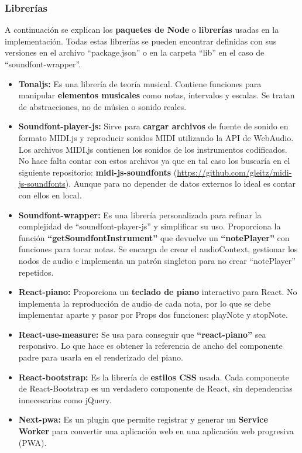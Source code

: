 \documentclass[12pt,twoside,titlepage]{report}
\begin{document}
\subsubsection{Librerías}
A continuación se explican los \textbf{paquetes de Node} o \textbf{librerías} usadas en la implementación. Todas estas librerías se pueden encontrar definidas con sus versiones en el archivo ``package.json'' o en la carpeta ``lib'' en el caso de ``soundfont-wrapper''.

\begin{itemize}
    \item \textbf{Tonaljs:} Es una librería de teoría musical. Contiene funciones para manipular \textbf{elementos musicales} como notas, intervalos y escalas. Se tratan de abstracciones, no de música o sonido reales.
    \item \textbf{Soundfont-player-js:} Sirve para \textbf{cargar archivos} de fuente de sonido en formato MIDI.js y reproducir sonidos MIDI utilizando la API de WebAudio. Los archivos MIDI.js contienen los sonidos de los instrumentos codificados. No hace falta contar con estos archivos ya que en tal caso los buscaría en el siguiente repositorio: \textbf{midi-js-soundfonts} (\url{https://github.com/gleitz/midi-js-soundfonts}). Aunque para no depender de datos externos lo ideal es contar con ellos en local.
    \item \textbf{Soundfont-wrapper:} Es una librería personalizada para refinar la complejidad de ``soundfont-player-js'' y simplificar su uso. Proporciona la función \textbf{``getSoundfontInstrument''} que devuelve un \textbf{``notePlayer''} con funciones para tocar notas. Se encarga de crear el audioContext, gestionar los nodos de audio e implementa un patrón singleton para no crear ``notePlayer'' repetidos.
    \item \textbf{React-piano:} Proporciona un \textbf{teclado de piano} interactivo para React. No implementa la reproducción de audio de cada nota, por lo que se debe implementar aparte y pasar por Props dos funciones: playNote y stopNote.
    \item \textbf{React-use-measure:} Se usa para conseguir que \textbf{``react-piano''} sea responsivo. Lo que hace es obtener la referencia de ancho del componente padre para usarla en el renderizado del piano.
    \item \textbf{React-bootstrap:} Es la librería de \textbf{estilos CSS} usada. Cada componente de React-Bootstrap es un verdadero componente de React, sin dependencias innecesarias como jQuery.
    \item \textbf{Next-pwa:} Es un plugin que permite registrar y generar un \textbf{Service Worker} para convertir una aplicación web en una aplicación web progresiva (PWA).
\end{itemize}
\end{document}
